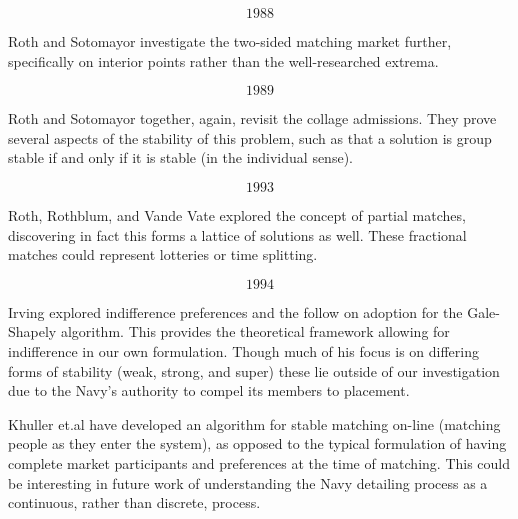\[1988\]

Roth and Sotomayor investigate the two-sided matching market further, specifically on interior points rather than the well-researched extrema. \cite{1988_Roth_Sotomayor}

\[1989\]

Roth and Sotomayor together, again, revisit the collage admissions. \cite{1989_Roth} They prove several aspects of the stability of this problem, such as that a solution is group stable if and only if it is stable (in the individual sense).


\[1993\]

Roth, Rothblum, and Vande Vate explored the concept of partial matches, discovering in fact this forms a lattice of solutions as well. These fractional matches could represent lotteries or time splitting. \cite{1993_Roth}

\[1994\]

Irving explored indifference preferences and the follow on adoption for the Gale-Shapely algorithm. \cite{1994_Irving} This provides the theoretical framework allowing for indifference in our own formulation. Though much of his focus is on differing forms of stability (weak, strong, and super) these lie outside of our investigation due to the Navy's authority to compel its members to placement.


Khuller et.al have developed an algorithm for stable matching on-line (matching people as they enter the system), as opposed to the typical formulation of having complete market participants and preferences at the time of matching. \cite{1994_Khuller} This could be interesting in future work of understanding the Navy detailing process as a continuous, rather than discrete, process.
